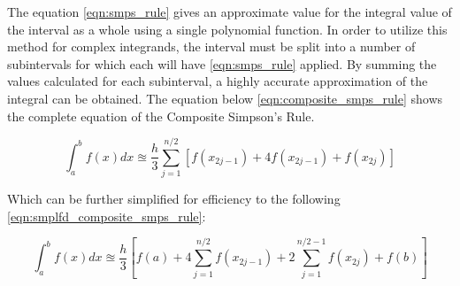 \documentclass{paper}
\begin{document}
The equation \eqref{eqn:smps_rule} gives an approximate value for the integral value of the interval as a whole using a single polynomial function.
In order to utilize this method for complex integrands, the interval must be split into a number of subintervals for which each will have \eqref{eqn:smps_rule} applied.
By summing the values calculated for each subinterval, a highly accurate approximation of the integral can be obtained.
The equation below \eqref{eqn:composite_smps_rule} shows the complete equation of the Composite Simpson's Rule.

\begin{equation}
    \label{eqn:composite_smps_rule}
    \int_a^b f(x) dx \approxeq \dfrac{h}{3} \sum_{j=1}^{n / 2} \left[f(x_{2j-1}) + 4f(x_{2j-1}) + f(x_{2j})\right]
\end{equation}

Which can be further simplified for efficiency to the following \eqref{eqn:smplfd_composite_smps_rule}:

\begin{equation}
    \label{eqn:smplfd_composite_smps_rule}
    \int_a^b f(x) dx \approxeq \dfrac{h}{3} \left[f(a) + 4 \sum_{j=1}^{n / 2} f(x_{2j-1}) + 2  \sum_{j=1}^{n / 2 - 1} f(x_{2j}) + f(b)\right]
\end{equation}
\end{document}
